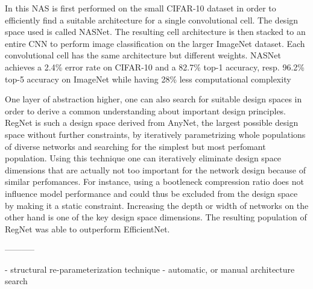 In \cite{BarretZoph.2018} this NAS is first performed on the small CIFAR-10 dataset in order to efficiently find a suitable architecture for a single convolutional cell. The design space used is called NASNet. The resulting cell architecture is then stacked to an entire CNN to perform image classification on the larger ImageNet dataset. Each convolutional cell has the same architecture but different weights. NASNet achieves a 2.4\% error rate on CIFAR-10 and a 82.7\% top-1 accuracy, resp. 96.2\% top-5 accuracy on ImageNet while having 28\% less computational complexity

One layer of abstraction higher, one can also search for suitable design spaces in order to derive a common understanding about important design principles. RegNet is such a design space derived from AnyNet, the largest possible design space without further constraints, by iteratively parametrizing whole populations of diverse networks and searching for the simplest but most perfomant population. Using this technique one can iteratively eliminate design space dimensions that are actually not too important for the network design because of similar perfomances. For instance, using a bootleneck compression ratio does not influence model performance and could thus be excluded from the design space by making it a static constraint. Increasing the depth or width of networks on the other hand is one of the key design space dimensions. The resulting population of RegNet was able to outperform EfficientNet. \cite{IlijaRadosavovic.2020}

-----------

- structural re-parameterization technique
- automatic, or manual architecture search